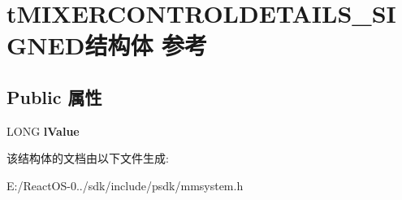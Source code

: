 \hypertarget{structt_m_i_x_e_r_c_o_n_t_r_o_l_d_e_t_a_i_l_s___s_i_g_n_e_d}{}\section{t\+M\+I\+X\+E\+R\+C\+O\+N\+T\+R\+O\+L\+D\+E\+T\+A\+I\+L\+S\+\_\+\+S\+I\+G\+N\+E\+D结构体 参考}
\label{structt_m_i_x_e_r_c_o_n_t_r_o_l_d_e_t_a_i_l_s___s_i_g_n_e_d}
\subsection*{Public 属性}
\begin{DoxyCompactItemize}
\item 
\mbox{\label{structt_m_i_x_e_r_c_o_n_t_r_o_l_d_e_t_a_i_l_s___s_i_g_n_e_d_a322e35892920ca038c70c596a1d752eb}} 
L\+O\+NG {\bfseries l\+Value}
\end{DoxyCompactItemize}


该结构体的文档由以下文件生成\+:\begin{DoxyCompactItemize}
\item 
E\+:/\+React\+O\+S-\/0../sdk/include/psdk/mmsystem.\+h\end{DoxyCompactItemize}
